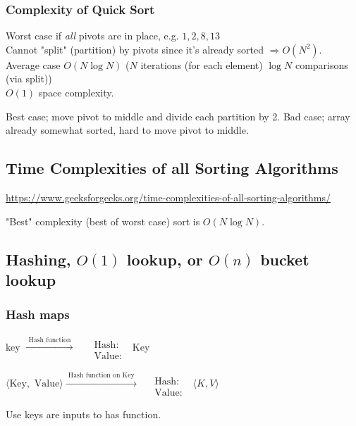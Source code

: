 \documentclass[10pt]{amsart}
\begin{document}
\begin{multicols*}{2}
\subsubsection{Complexity of Quick Sort}

Worst case if \emph{all} pivots are in place, e.g. $1,2,8,13$ \\
Cannot "split" (partition) by pivots since it's already sorted $\Longrightarrow O(N^2)$. \\
Average case $O(N\log{N})$ ($N$ iterations (for each element) $\log{N}$ comparisons (via split)) \\
$O(1)$ space complexity.

Best case; move pivot to middle and divide each partition by 2.
Bad case; array already somewhat sorted, hard to move pivot to middle.


\subsection{Time Complexities of all Sorting Algorithms}

\url{https://www.geeksforgeeks.org/time-complexities-of-all-sorting-algorithms/}

"Best" complexity (best of worst case) sort is $O(N \log{N})$.

\subsection{Hashing, $O(1)$ lookup, or $O(n)$ bucket lookup}


\subsubsection{Hash maps} 

key $\xrightarrow{ \text{ Hash function } }$  $\begin{aligned} & \quad \\ 
& \text{ Hash: } \\
& \text{ Value: } \end{aligned}$ Key 

$\langle \text{Key}, \text{ Value} \rangle \xrightarrow{ \text{ Hash function on Key } } \begin{aligned} & \quad \\ 
& \text{ Hash: } \\
& \text{ Value: } \end{aligned}$ \quad $\langle K , V \rangle$ 

Use keys are inputs to has function.


\end{multicols*}
\end{document}
